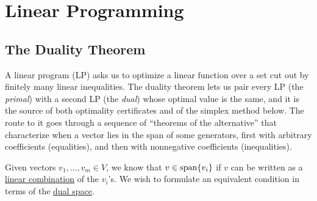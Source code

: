 \section{Linear Programming}

\subsection{The Duality Theorem}

	A linear program (LP) asks us to optimize a linear function over a set cut out by finitely many linear inequalities. The duality theorem lets us pair every LP (the \textit{primal}) with a second LP (the \textit{dual}) whose optimal value is the same, and it is the source of both optimality certificates and of the simplex method below. The route to it goes through a sequence of ``theorems of the alternative'' that characterize when a vector lies in the span of some generators, first with arbitrary coefficients (equalities), and then with nonnegative coefficients (inequalities). 

	Given vectors $v_1, \ldots, v_m \in V$, we know that $v \in \operatorname{span}\{v_i\}$ if $v$ can be written as a \hyperref[lin-def:linear-combination]{linear combination} of the $v_i$'s. We wish to formulate an equivalent condition in terms of the \hyperref[lin-def:dual-space]{dual space}. 

